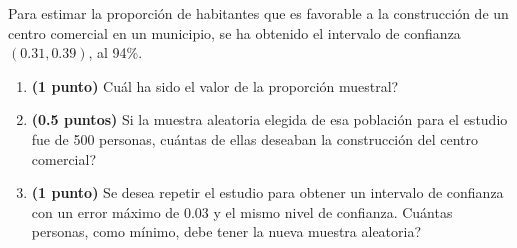
Para estimar la proporción de habitantes que es favorable a la construcción de un centro comercial en un municipio, se ha obtenido el intervalo de confianza $(0.31,0.39)$, al 94\%.
\begin{enumerate}[label=\alph*)]
\item \textbf{(1 punto)} \textquestiondown{}Cuál ha sido el valor de la proporción muestral?
\item \textbf{(0.5 puntos)} Si la muestra aleatoria elegida de esa población para el estudio fue de 500 personas, \textquestiondown{}cuántas de ellas deseaban la construcción del centro comercial?
\item \textbf{(1 punto)} Se desea repetir el estudio para obtener un intervalo de confianza con un error máximo de 0.03 y el mismo nivel de confianza. \textquestiondown{}Cuántas personas, como mínimo, debe tener la nueva muestra aleatoria?
\end{enumerate}
